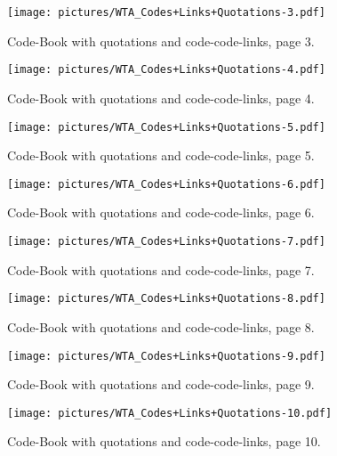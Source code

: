 \documentclass{article}
\begin{document}
\begin{figure*}[h!]
  \centering
  \texttt{[image: pictures/WTA\_Codes+Links+Quotations-3.pdf]}
  \caption{\label{fig:WTApage3}%
           Code-Book with quotations and code-code-links, page 3.}
\end{figure*}

\begin{figure*}[h!]
  \centering
  \texttt{[image: pictures/WTA\_Codes+Links+Quotations-4.pdf]}
  \caption{\label{fig:WTApage4}%
           Code-Book with quotations and code-code-links, page 4.}
\end{figure*}

\begin{figure*}[h!]
  \centering
  \texttt{[image: pictures/WTA\_Codes+Links+Quotations-5.pdf]}
  \caption{\label{fig:WTApage5}%
           Code-Book with quotations and code-code-links, page 5.}
\end{figure*}

\begin{figure*}[h!]
  \centering
  \texttt{[image: pictures/WTA\_Codes+Links+Quotations-6.pdf]}
  \caption{\label{fig:WTApage6}%
           Code-Book with quotations and code-code-links, page 6.}
\end{figure*}

\begin{figure*}[h!]
  \centering
  \texttt{[image: pictures/WTA\_Codes+Links+Quotations-7.pdf]}
  \caption{\label{fig:WTApage7}%
          Code-Book with quotations and code-code-links, page 7.}
\end{figure*}

\begin{figure*}[h!]
  \centering
  \texttt{[image: pictures/WTA\_Codes+Links+Quotations-8.pdf]}
  \caption{\label{fig:WTApage8}%
           Code-Book with quotations and code-code-links, page 8.}
\end{figure*}

\begin{figure*}[h!]
  \centering
  \texttt{[image: pictures/WTA\_Codes+Links+Quotations-9.pdf]}
  \caption{\label{fig:WTApage9}%
           Code-Book with quotations and code-code-links, page 9.}
\end{figure*}

\begin{figure*}[h!]
  \centering
  \texttt{[image: pictures/WTA\_Codes+Links+Quotations-10.pdf]}
  \caption{\label{fig:WTApage10}%
           Code-Book with quotations and code-code-links, page 10.}
\end{figure*}
\end{document}
